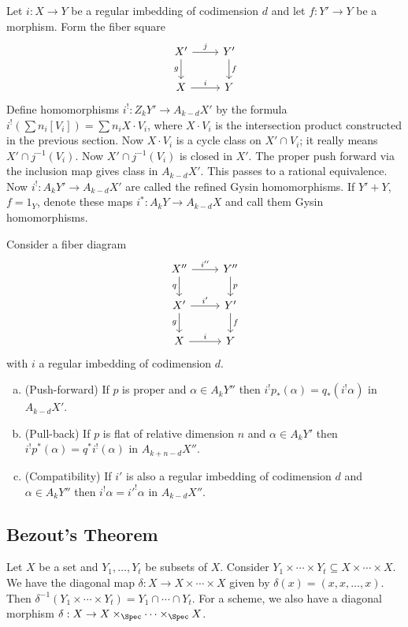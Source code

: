 Let $i: X \to Y$ be a regular imbedding of codimension $d$ and let $f: Y' \to Y$ be a morphism. Form the fiber square
	\[
	\begin{tikzcd}
	X' \arrow[swap]{d}{g} \arrow{r}{j} & Y' \arrow{d}{f} \\
	X \arrow{r}{i} & Y
	\end{tikzcd}
	\]
Define homomorphisms $i^!: Z_kY' \to A_{k-d} X'$ by the formula $i^!\left(\sum n_i[V_i]\right)= \sum n_i X \cdot V_i$, where $X \cdot V_i$ is the intersection product constructed in the previous section. Now $X \cdot V_i$ is a cycle class on $X' \cap V_i$; it really means $X' \cap j^{-1}(V_i)$. Now $X' \cap j^{-1}(V_i)$ is closed in $X'$. The proper push forward via the inclusion map gives class in $A_{k-d} X'$. This passes to a rational equivalence. Now $i^!: A_k Y' \to A_{k-d} X'$ are called the refined Gysin homomorphisms. If $Y'+Y$, $f=1_Y$, denote these maps $i^*: A_kY \to A_{k-d}X$ and call them Gysin homomorphisms. 

\begin{thmm}
Consider a fiber diagram
	\[
	\begin{tikzcd}
	X'' \arrow[swap]{d}{q} \arrow{r}{i''} & Y'' \arrow{d}{p} \\
	X' \arrow[swap]{d}{g} \arrow{r}{i'} & Y' \arrow{d}{f} \\
	X \arrow{r}{i} & Y
	\end{tikzcd}
	\]
with $i$ a regular imbedding of codimension $d$. 
\begin{enumerate}[(a)]
\item (Push-forward) If $p$ is proper and $\alpha \in A_k Y''$ then $i^! p_*(\alpha)=q_*(i^!\alpha)$ in $A_{k-d}X'$. 
\item (Pull-back) If $p$ is flat of relative dimension $n$ and $\alpha \in A_kY'$ then $i^! p^*(\alpha)=q^*i^!(\alpha)$ in $A_{k+n-d} X''$. 
\item (Compatibility) If $i'$ is also a regular imbedding of codimension $d$ and $\alpha \in A_k Y''$ then $i^! \alpha= i'^! \alpha$ in $A_{k-d}X''$.
\end{enumerate}
\end{thmm}



\subsection{Bezout's Theorem}



Let $X$ be a set and $Y_1,\ldots,Y_t$ be subsets of $X$. Consider $Y_1 \times \cdots \times Y_t \subseteq X \times \cdots \times X$. We have the diagonal map $\delta: X \to X \times \cdots \times X$ given by $\delta(x)=(x,x,\ldots,x)$. Then $\delta^{-1}(Y_1\times \cdots \times Y_t)=Y_1 \cap \cdots \cap Y_t$. For a scheme, we also have a diagonal morphism $\delta: X \to X \times_{\Spec} \cdots \times_{\Spec} X$.

